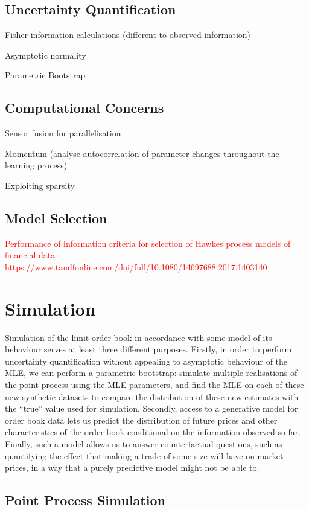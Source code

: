 \documentclass[honours,12pt]{unswthesis}
\numberwithin{equation}{section}
\begin{document}
\section{Uncertainty Quantification}
Fisher information calculations (different to observed information)

Asymptotic normality

Parametric Bootstrap

\section{Computational Concerns}
Sensor fusion for parallelisation

Momentum (analyse autocorrelation of parameter changes throughout the learning process)

Exploiting sparsity \cite{NickelLe}

\section{Model Selection}

\textcolor{red}{Performance of information criteria for selection of Hawkes process models of financial data https://www.tandfonline.com/doi/full/10.1080/14697688.2017.1403140}

\chapter{Simulation}
Simulation of the limit order book in accordance with some model of its behaviour serves at least three different purposes. Firstly, in order to perform uncertainty quantification without appealing to asymptotic behaviour of the MLE, we can perform a parametric bootstrap: simulate multiple realisations of the point process using the MLE parameters, and find the MLE on each of these new synthetic datasets to compare the distribution of these new estimates with the ``true'' value used for simulation. Secondly, access to a generative model for order book data lets us predict the distribution of future prices and other characteristics of the order book conditional on the information observed so far. Finally, such a model allows us to answer counterfactual questions, such as quantifying the effect that making a trade of some size will have on market prices, in a way that a purely predictive model might not be able to.

\section{Point Process Simulation}
\end{document}
